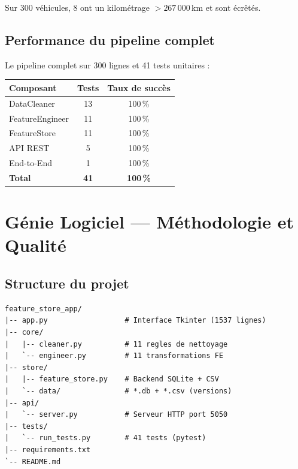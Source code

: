 \documentclass[12pt,a4paper]{article}
\begin{document}
Sur 300 véhicules, 8 ont un kilométrage $> 267\,000$\,km et sont écrêtés.

\subsection{Performance du pipeline complet}

Le pipeline complet sur 300 lignes et 41 tests unitaires :

\begin{center}
\renewcommand{\arraystretch}{1.3}
\begin{tabular}{lcc}
  \toprule
  \textbf{Composant} & \textbf{Tests} & \textbf{Taux de succès} \\
  \midrule
  DataCleaner    & 13 & 100\,\% \\
  FeatureEngineer & 11 & 100\,\% \\
  FeatureStore   & 11 & 100\,\% \\
  API REST       & 5  & 100\,\% \\
  End-to-End     & 1  & 100\,\% \\
  \midrule
  \textbf{Total} & \textbf{41} & \textbf{100\,\%} \\
  \bottomrule
\end{tabular}
\end{center}

\section{Génie Logiciel --- Méthodologie et Qualité}

\subsection{Structure du projet}

\begin{lstlisting}[language={}, caption={Arborescence du projet}]
feature_store_app/
|-- app.py                  # Interface Tkinter (1537 lignes)
|-- core/
|   |-- cleaner.py          # 11 regles de nettoyage
|   `-- engineer.py         # 11 transformations FE
|-- store/
|   |-- feature_store.py    # Backend SQLite + CSV
|   `-- data/               # *.db + *.csv (versions)
|-- api/
|   `-- server.py           # Serveur HTTP port 5050
|-- tests/
|   `-- run_tests.py        # 41 tests (pytest)
|-- requirements.txt
`-- README.md
\end{lstlisting}
\end{document}
